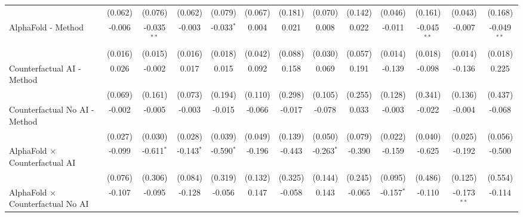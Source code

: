\begin{tabular}{lcccccccccccc}
                                                              & (0.062) & (0.076)       & (0.062)      & (0.079)      & (0.067) & (0.181) & (0.070)      & (0.142)       & (0.046)       & (0.161)       & (0.043)       & (0.168)\\   
   AlphaFold - Method                                         & -0.006  & -0.035$^{**}$ & -0.003       & -0.033$^{*}$ & 0.004   & 0.021   & 0.008        & 0.022         & -0.011        & -0.045$^{**}$ & -0.007        & -0.049$^{**}$\\   
                                                              & (0.016) & (0.015)       & (0.016)      & (0.018)      & (0.042) & (0.088) & (0.030)      & (0.057)       & (0.014)       & (0.018)       & (0.014)       & (0.018)\\   
   Counterfactual AI - Method                                 & 0.026   & -0.002        & 0.017        & 0.015        & 0.092   & 0.158   & 0.069        & 0.191         & -0.139        & -0.098        & -0.136        & 0.225\\   
                                                              & (0.069) & (0.161)       & (0.073)      & (0.194)      & (0.110) & (0.298) & (0.105)      & (0.255)       & (0.128)       & (0.341)       & (0.136)       & (0.437)\\   
   Counterfactual No AI - Method                              & -0.002  & -0.005        & -0.003       & -0.015       & -0.066  & -0.017  & -0.078       & 0.033         & -0.003        & -0.022        & -0.004        & -0.068\\   
                                                              & (0.027) & (0.030)       & (0.028)      & (0.039)      & (0.049) & (0.139) & (0.050)      & (0.079)       & (0.022)       & (0.040)       & (0.025)       & (0.056)\\   
   AlphaFold $\times$ Counterfactual AI                       & -0.099  & -0.611$^{*}$  & -0.143$^{*}$ & -0.590$^{*}$ & -0.196  & -0.443  & -0.263$^{*}$ & -0.390        & -0.159        & -0.625        & -0.192        & -0.500\\   
                                                              & (0.076) & (0.306)       & (0.084)      & (0.319)      & (0.132) & (0.325) & (0.144)      & (0.245)       & (0.095)       & (0.486)       & (0.125)       & (0.554)\\   
   AlphaFold $\times$ Counterfactual No AI                    & -0.107  & -0.095        & -0.128       & -0.056       & 0.147   & -0.058  & 0.143        & -0.065        & -0.157$^{*}$  & -0.110        & -0.173$^{**}$ & -0.114\\   

\end{tabular}
